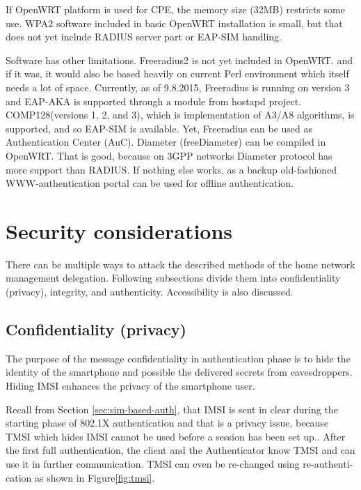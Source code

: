 \documentclass[12pt,a4paper,english]{tutthesis}
\begin{document}
\begin{otherlanguage}{english}
{If OpenWRT platform  is used for CPE, the memory size (32MB) restricts some
use.
WPA2 software included in basic OpenWRT installation is small,
but that does not yet include RADIUS server part or EAP-SIM handling.


Software has other limitations. Freeradius2 is not yet included  in OpenWRT.
and if it was, it would also be based heavily on current Perl environment which
itself needs a lot of space.
Currently, as of 9.8.2015, Freeradius is running on version 3 and
EAP-AKA is supported through a module from hostapd project.
COMP128(versions 1, 2, and 3), which is implementation  of A3/A8
algorithms, is  supported\cite{freeradius2}, and so EAP-SIM is available.
Yet, Freeradius can be used as Authentication Center (AuC).
Diameter (freeDiameter) can be compiled in OpenWRT. That is good,
because on 3GPP networks Diameter protocol has more support than RADIUS.
If nothing else works, as a backup old-fashioned WWW-authentication
portal can be used for offline authentication.


\section{Security considerations}
\label{sec-6-4}



There can be multiple ways to attack the described methods of
the home network management delegation. Following subsections divide them into
confidentiality (privacy), integrity, and
authenticity. Accessibility is also discussed.
\subsection{Confidentiality (privacy)}
\label{sec-6-4-1}

The purpose of the message confidentiality in authentication phase is
to hide the identity of the smartphone and possible the delivered
secrets from eavesdroppers. Hiding IMSI enhances the privacy of the smartphone user. 


Recall from Section \ref{sec:sim-based-auth}, that IMSI is sent in clear 
during the starting phase of 802.1X authentication and that is a privacy 
issue, because TMSI which hides IMSI cannot be used before a session
has been set up.\cite[p.66]{rfc4186}.
After the first full authentication, the client and the Authenticator 
know TMSI and can use it in further communication. 
TMSI can even be re-changed using re-authentication as shown in Figure\ref{fig:tmsi}.

}
\end{otherlanguage}
\end{document}
